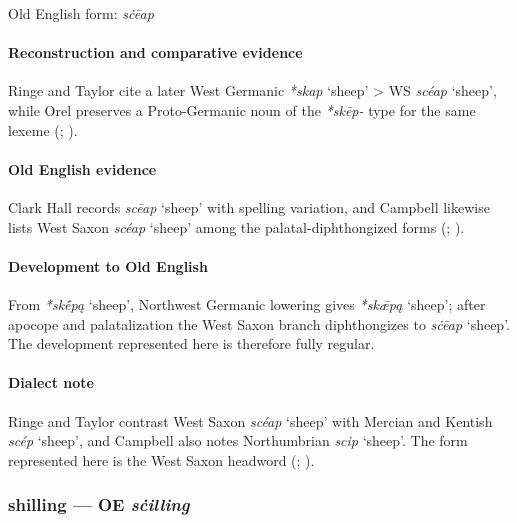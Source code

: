 \documentclass[
  british,
  a4paper,
]{article}
\providecommand{\Recon}[1]{\emph{*#1}}
\begin{document}
Old English form: \emph{sċēap}

\paragraph{Reconstruction and comparative
evidence}\label{reconstruction-and-comparative-evidence-50}

Ringe and Taylor cite a later West Germanic \emph{*skap} `sheep'
\textgreater{} WS \emph{scéap} `sheep', while Orel preserves a
Proto-Germanic noun of the \emph{*skēp-} type for the same lexeme
(;
).

\paragraph{Old English evidence}\label{old-english-evidence-52}

Clark Hall records \emph{scēap} `sheep' with spelling variation, and
Campbell likewise lists West Saxon \emph{scéap} `sheep' among the
palatal-diphthongized forms (; ).

\paragraph{Development to Old
English}\label{development-to-old-english-51}

From \Recon{skḗpą} `sheep', Northwest Germanic lowering gives
\Recon{skǣpą} `sheep'; after apocope and palatalization the West Saxon
branch diphthongizes to \emph{sċēap} `sheep'. The development
represented here is therefore fully regular.

\paragraph{Dialect note}\label{dialect-note-4}

Ringe and Taylor contrast West Saxon \emph{scéap} `sheep' with Mercian
and Kentish \emph{scép} `sheep', and Campbell also notes Northumbrian
\emph{scip} `sheep'. The form represented here is the West Saxon
headword (;
).

\subsubsection{\texorpdfstring{shilling --- OE
\emph{sċilling}}{shilling --- OE sċilling}}\label{shilling-oe-sux10billing}
\end{document}
